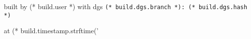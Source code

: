     \vfill
    {
        \color{white}
        \hfill built by (* build.user *) with dgs \texttt{(* build.dgs.branch *): (* build.dgs.hash *)}

        \hfill at (* build.timestamp.strftime('%
    }

